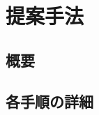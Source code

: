 \chapter{提案手法}
\label{chap:method}

\section{概要}
\label{sec:overview}

\section{各手順の詳細}
\label{sec:procedure}
